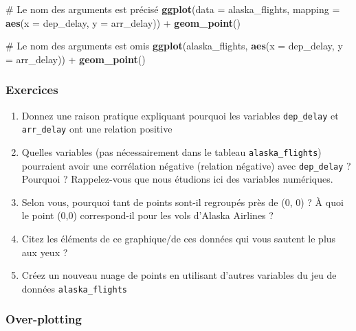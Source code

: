 \documentclass[
  a4paper,
]{article}
\newenvironment{Shaded}{\begin{snugshade}}{\end{snugshade}}
\newcommand{\CommentTok}[1]{\textcolor[rgb]{0.54,0.53,0.53}{#1}}
\newcommand{\DataTypeTok}[1]{\textcolor[rgb]{0.00,0.34,0.68}{#1}}
\newcommand{\KeywordTok}[1]{\textcolor[rgb]{0.12,0.11,0.11}{\textbf{#1}}}
\newcommand{\NormalTok}[1]{\textcolor[rgb]{0.12,0.11,0.11}{#1}}
\newcommand{\OperatorTok}[1]{\textcolor[rgb]{0.12,0.11,0.11}{#1}}
\newcommand{\StringTok}[1]{\textcolor[rgb]{0.75,0.01,0.01}{#1}}
\providecommand{\tightlist}{%
  \setlength{\itemsep}{0pt}\setlength{\parskip}{0pt}}
\begin{document}
\begin{Shaded}
\begin{Highlighting}[]
\CommentTok{# Le nom des arguments est précisé}
\KeywordTok{ggplot}\NormalTok{(}\DataTypeTok{data =}\NormalTok{ alaska_flights, }\DataTypeTok{mapping =} \KeywordTok{aes}\NormalTok{(}\DataTypeTok{x =}\NormalTok{ dep_delay, }\DataTypeTok{y =}\NormalTok{ arr_delay)) }\OperatorTok{+}\StringTok{ }
\StringTok{  }\KeywordTok{geom_point}\NormalTok{()}

\CommentTok{# Le nom des arguments est omis}
\KeywordTok{ggplot}\NormalTok{(alaska_flights, }\KeywordTok{aes}\NormalTok{(}\DataTypeTok{x =}\NormalTok{ dep_delay, }\DataTypeTok{y =}\NormalTok{ arr_delay)) }\OperatorTok{+}\StringTok{ }
\StringTok{  }\KeywordTok{geom_point}\NormalTok{()}
\end{Highlighting}
\end{Shaded}

\hypertarget{exercices-2}{%
\subsubsection{Exercices}\label{exercices-2}}

\begin{enumerate}
\def\labelenumi{\arabic{enumi}.}
\tightlist
\item
  Donnez une raison pratique expliquant pourquoi les variables \texttt{dep\_delay} et \texttt{arr\_delay} ont une relation positive
\item
  Quelles variables (pas nécessairement dans le tableau \texttt{alaska\_flights}) pourraient avoir une corrélation négative (relation négative) avec \texttt{dep\_delay} ? Pourquoi ? Rappelez-vous que nous étudions ici des variables numériques.
\item
  Selon vous, pourquoi tant de points sont-il regroupés près de (0, 0) ? À quoi le point (0,0) correspond-il pour les vols d'Alaska Airlines ?
\item
  Citez les éléments de ce graphique/de ces données qui vous sautent le plus aux yeux ?
\item
  Créez un nouveau nuage de points en utilisant d'autres variables du jeu de données \texttt{alaska\_flights}
\end{enumerate}

\hypertarget{over-plotting}{%
\subsubsection{Over-plotting}\label{over-plotting}}
\end{document}
